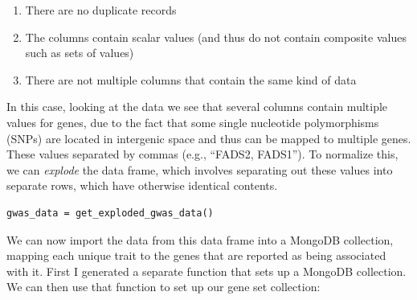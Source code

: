 \begin{enumerate}
\item There are no duplicate records
\item The columns contain scalar values (and thus do not contain composite values such as sets of values)
\item There are not multiple columns that contain the same kind of data
\end{enumerate}

In this case, looking at the data we see that several columns contain multiple values for genes, due to the fact that some single nucleotide polymorphisms (SNPs) are located in intergenic space and thus can be mapped to multiple genes.  These values separated by commas (e.g., ``FADS2, FADS1'').  To normalize this, we can \textit{explode} the data frame, which involves separating out these values into separate rows, which have otherwise identical contents.

\begin{lstlisting}[style=Pythonshort]
gwas_data = get_exploded_gwas_data()
\end{lstlisting}

We can now import the data from this data frame into a MongoDB collection, mapping each unique trait to the genes that are reported as being associated with it.  First I generated a separate function that sets up a MongoDB collection.  We can then use that function to set up our gene set collection:

